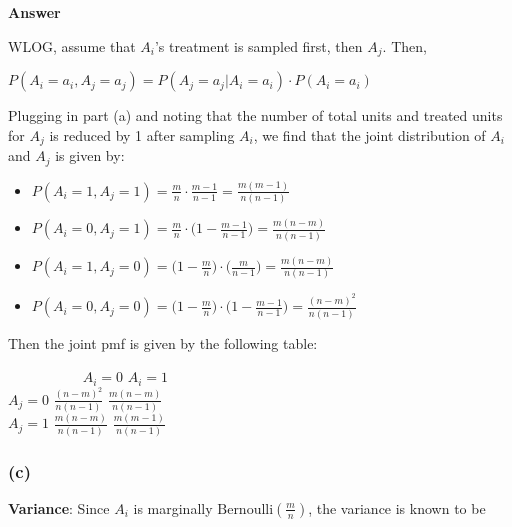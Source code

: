 \documentclass[
  11pt,
  letterpaper,
  DIV=11,
  numbers=noendperiod]{scrartcl}
\providecommand{\tightlist}{%
  \setlength{\itemsep}{0pt}\setlength{\parskip}{0pt}}\usepackage{longtable,booktabs,array}
\begin{document}
\begin{tcolorbox}[enhanced jigsaw, breakable, leftrule=.75mm, toprule=.15mm, arc=.35mm, bottomrule=.15mm, left=2mm, opacityback=0, colback=white, colframe=quarto-callout-note-color-frame, rightrule=.15mm]

\textbf{Answer}\vspace{2mm}

WLOG, assume that \(A_i\)'s treatment is sampled first, then \(A_j\).
Then,

\(P(A_i = a_i, A_j = a_j) = P(A_j = a_j | A_i = a_i) \cdot P(A_i = a_i)\)

Plugging in part (a) and noting that the number of total units and
treated units for \(A_j\) is reduced by 1 after sampling \(A_i\), we
find that the joint distribution of \(A_i\) and \(A_j\) is given by:

\begin{itemize}
\tightlist
\item
  \(P(A_i = 1, A_j = 1) = \frac{m}{n} \cdot \frac{m-1}{n-1} = \frac{m(m-1)}{n(n-1)}\)
\item
  \(P(A_i = 0, A_j = 1) = \frac{m}{n} \cdot \Big(1 - \frac{m-1}{n-1}\Big) = \frac{m(n-m)}{n(n-1)}\)
\item
  \(P(A_i = 1, A_j = 0) = \Big(1 - \frac{m}{n}\Big) \cdot \Big(\frac{m}{n-1}\Big) = \frac{m(n-m)}{n(n-1)}\)
\item
  \(P(A_i = 0, A_j = 0) = \Big(1 - \frac{m}{n}\Big) \cdot \Big(1 - \frac{m-1}{n-1}\Big) = \frac{(n-m)^2}{n(n-1)}\)
\end{itemize}

Then the joint pmf is given by the following table:

~~~~~~~~~~\textbar{} \(A_i = 0\) \textbar{} \(A_i = 1\) \textbar{}\\
\(A_j = 0\) \textbar{} \(\frac{(n-m)^2}{n(n-1)}\) \textbar{}
\(\frac{m(n-m)}{n(n-1)}\) \textbar{}\\
\(A_j = 1\) \textbar{} \(\frac{m(n-m)}{n(n-1)}\) \textbar{}
\(\frac{m(m-1)}{n(n-1)}\) \textbar{}

\end{tcolorbox}

\hypertarget{c}{%
\subsubsection{(c)}\label{c}}

\textbf{Variance}: Since \(A_i\) is marginally
\(\text{Bernoulli}(\frac{m}{n})\), the variance is known to be
\end{document}
